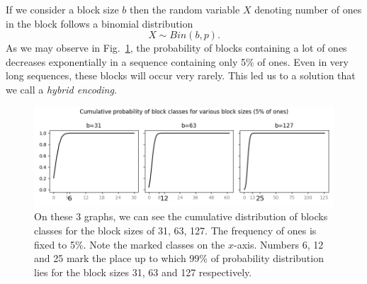 If we consider a block size $b$ then the random variable $X$ denoting number of ones in the
block follows a binomial distribution $$X \sim Bin(b,p).$$ As we may observe in
Fig.~\ref{obr:hybridEncodingDistribution}, the probability of blocks
containing a lot of ones decreases exponentially in a sequence containing only 5\% of ones.
Even in very long sequences, these blocks will occur very rarely. This led us to a solution
that we call a \textit{hybrid encoding}.

\begin{figure}
	\centerline{
		\includegraphics[width=\textwidth]{images/hybrid_encoding_motivation}
	}
	\caption[TODO]{On these 3 graphs, we can see the cumulative distribution
    of blocks classes for the block sizes of 31, 63, 127. The frequency of ones is
    fixed to 5\%. Note the marked classes on the $x$-axis. Numbers 6, 12 and
    25 mark the place up to which 99\% of probability distribution lies for
    the block sizes 31, 63 and 127 respectively.
	}
	\label{obr:hybridEncodingDistribution}
\end{figure}

